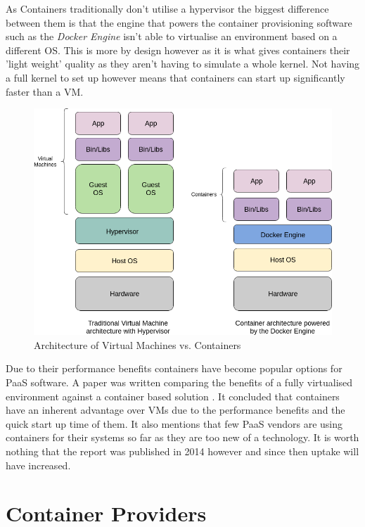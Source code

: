 As Containers traditionally don't utilise a hypervisor the biggest difference between them is that the engine that powers the container provisioning software such as the \textit{Docker Engine} isn't able to virtualise an environment based on a different OS. This is more by design however as it is what gives containers their 'light weight' quality as they aren't having to simulate a whole kernel. Not having a full kernel to set up however means that containers can start up significantly faster than a VM.

\begin{figure}[h!]
    \centering
    \includegraphics[scale=0.4]{res/Virtualisation.png}
    \caption{Architecture of Virtual Machines vs. Containers}
    \label{fig:architecture}
\end{figure}

Due to their performance benefits containers have become popular options for PaaS software. A paper was written comparing the benefits of a fully virtualised environment against a container based solution \cite{contsvsvirt}. It concluded that containers have an inherent advantage over VMs due to the performance benefits and the quick start up time of them. It also mentions that few PaaS vendors are using containers for their systems so far as they are too new of a technology. It is worth nothing that the report was published in 2014 however and since then uptake will have increased.

\section{Container Providers}

